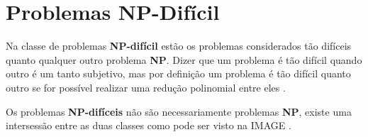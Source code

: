 \section{Problemas NP-Difícil}
Na classe de problemas \textbf{NP-difícil} estão os problemas considerados tão difíceis quanto qualquer outro problema \textbf{NP}. Dizer que um problema é tão difícil quando outro é um tanto subjetivo, mas por definição um problema é tão difícil quanto outro se for possível realizar uma redução polinomial entre eles \cite{HOPCROFT1974}.

Os problemas \textbf{NP-difíceis} não são necessariamente problemas \textbf{NP}, existe uma intersessão entre as duas classes como pode ser visto na IMAGE .
